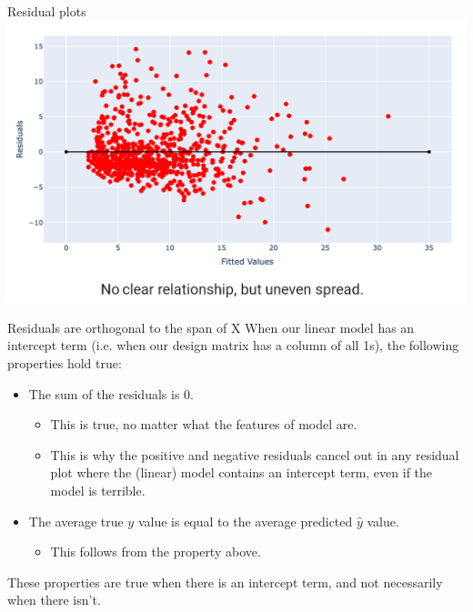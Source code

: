 \documentclass[aspectratio=169]{../latex_main/tntbeamer}  %
\begin{document}
	
	\begin{frame}{Residual plots}
	    \centering
	    \includegraphics[scale=.45]{Bild12}
	\end{frame}
	
	
	\begin{frame}{Residuals are orthogonal to the span of X}
	    When our linear model has an intercept term (i.e. when our design matrix has a column of all 1s), the following properties hold true:
	    \begin{itemize}
	        \item The sum of the residuals is 0.
            \begin{itemize}
                \item This is true, no matter what the features of model are.
                \item This is why the positive and negative residuals cancel out in any residual plot where the (linear) model contains an intercept term, even if the model is terrible.
            \end{itemize}
            \item The average true $y$ value is equal to the average predicted $\hat{y}$ value.
            \begin{itemize}
                \item This follows from the property above.
            \end{itemize}
	    \end{itemize}
	    
        These properties are true when there is an intercept term, and not necessarily when there isn’t.

	\end{frame}
\end{document}
